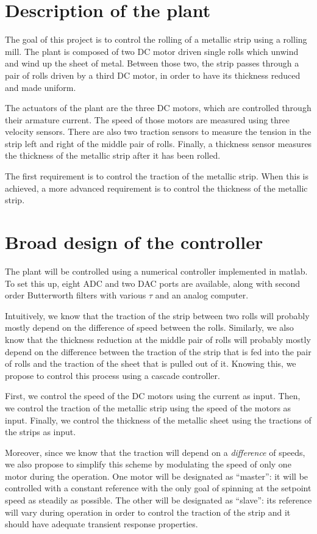 \section{Description of the plant}
The goal of this project is to control the rolling of a metallic strip using a rolling mill. The plant is composed of two DC motor driven single rolls which unwind and wind up the sheet of metal. Between those two, the strip passes through a pair of rolls driven by a third DC motor, in order to have its thickness reduced and made uniform.

The actuators of the plant are the three DC motors, which are controlled through their armature current. The speed of those motors are measured using three velocity sensors. There are also two traction sensors to measure the tension in the strip left and right of the middle pair of rolls. Finally, a thickness sensor measures the thickness of the metallic strip after it has been rolled.

The first requirement is to control the traction of the metallic strip. When this is achieved, a more advanced requirement is to control the thickness of the metallic strip.

\section{Broad design of the controller}
The plant will be controlled using a numerical controller implemented in matlab. To set this up, eight ADC and two DAC ports are available, along with second order Butterworth filters with various $\tau$ and an analog computer.

Intuitively, we know that the traction of the strip between two rolls will probably mostly depend on the difference of speed between the rolls. Similarly, we also know that the thickness reduction at the middle pair of rolls will probably mostly depend on the difference between the traction of the strip that is fed into the pair of rolls and the traction of the sheet that is pulled out of it. Knowing this, we propose to control this process using a cascade controller.

First, we control the speed of the DC motors using the current as input. Then, we control the traction of the metallic strip using the speed of the motors as input. Finally, we control the thickness of the metallic sheet using the tractions of the strips as input.

Moreover, since we know that the traction will depend on a \emph{difference} of speeds, we also propose to simplify this scheme by modulating the speed of only one motor during the operation. One motor will be designated as ``master'': it will be controlled with a constant reference with the only goal of spinning at the setpoint speed as steadily as possible. The other will be designated as ``slave'': its reference will vary during operation in order to control the traction of the strip and it should have adequate transient response properties.

